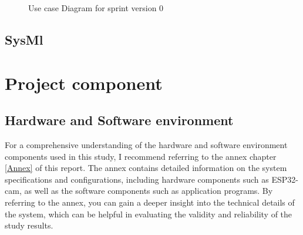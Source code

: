 \begin{figure}[htbp]
    \caption{Use case Diagram for sprint version 0}
    \label{fig:usecase-sprint0}
\end{figure}




\subsection{SysMl}


\section{Project component}
\subsection{Hardware and Software environment}
For a comprehensive understanding of the hardware and software environment components used in this study, I recommend referring to the annex chapter \ref{Annex} of this report. The annex contains detailed information on the system specifications and configurations, including hardware components such as ESP32-cam, as well as the software components such as  application programs. By referring to the annex, you can gain a deeper insight into the technical details of the system, which can be helpful in evaluating the validity and reliability of the study results.


